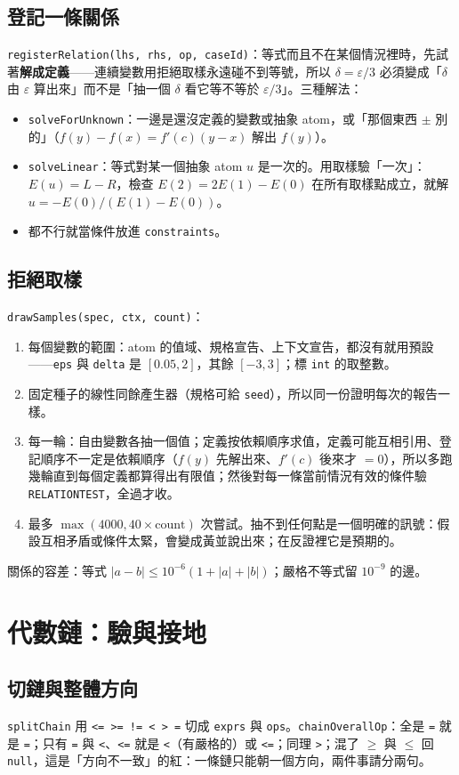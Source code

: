 \documentclass[11pt,a4paper,oneside]{book}
\renewcommand{\_}{\ifmmode\origunderscore\else\textunderscore\allowbreak\fi}
\newcommand{\code}[1]{\texttt{#1}}
\begin{document}
\section{登記一條關係}
\code{registerRelation(lhs, rhs, op, caseId)}：等式而且不在某個情況裡時，先試著\textbf{解成定義}——連續變數用拒絕取樣永遠碰不到等號，所以 $\delta = \varepsilon/3$ 必須變成「$\delta$ 由 $\varepsilon$ 算出來」而不是「抽一個 $\delta$ 看它等不等於 $\varepsilon/3$」。三種解法：
\begin{itemize}
  \item \code{solveForUnknown}：一邊是還沒定義的變數或抽象 atom，或「那個東西 $\pm$ 別的」（$f(y) - f(x) = f'(c)(y-x)$ 解出 $f(y)$）。
  \item \code{solveLinear}：等式對某一個抽象 atom $u$ 是一次的。用取樣驗「一次」：$E(u) = L - R$，檢查 $E(2) = 2E(1) - E(0)$ 在所有取樣點成立，就解 $u = -E(0)/(E(1)-E(0))$。
  \item 都不行就當條件放進 \code{constraints}。
\end{itemize}

\section{拒絕取樣}
\code{drawSamples(spec, ctx, count)}：
\begin{enumerate}[label=\arabic*.]
  \item 每個變數的範圍：atom 的值域、規格宣告、上下文宣告，都沒有就用預設——\code{eps} 與 \code{delta} 是 $[0.05, 2]$，其餘 $[-3, 3]$；標 \code{int} 的取整數。
  \item 固定種子的線性同餘產生器（規格可給 \code{seed}），所以同一份證明每次的報告一樣。
  \item 每一輪：自由變數各抽一個值；定義按依賴順序求值，定義可能互相引用、登記順序不一定是依賴順序（$f(y)$ 先解出來、$f'(c)$ 後來才 $= 0$），所以多跑幾輪直到每個定義都算得出有限值；然後對每一條當前情況有效的條件驗 \code{RELATION\_TEST}，全過才收。
  \item 最多 $\max(4000, 40\times\text{count})$ 次嘗試。抽不到任何點是一個明確的訊號：假設互相矛盾或條件太緊，會變成黃並說出來；在反證裡它是預期的。
\end{enumerate}
關係的容差：等式 $|a-b| \le 10^{-6}(1+|a|+|b|)$；嚴格不等式留 $10^{-9}$ 的邊。

\chapter{代數鏈：驗與接地}
\section{切鏈與整體方向}
\code{splitChain} 用 \code{<= >= != < > =} 切成 \code{exprs} 與 \code{ops}。\code{chainOverallOp}：全是 \code{=} 就是 \code{=}；只有 \code{=} 與 \code{<}、\code{<=} 就是 \code{<}（有嚴格的）或 \code{<=}；同理 \code{>}；混了 $\ge$ 與 $\le$ 回 \code{null}，這是「方向不一致」的紅：一條鏈只能朝一個方向，兩件事請分兩句。
\end{document}
